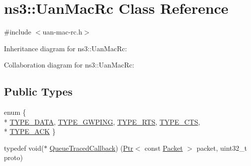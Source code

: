 \hypertarget{classns3_1_1UanMacRc}{}\section{ns3\+:\+:Uan\+Mac\+Rc Class Reference}
\label{classns3_1_1UanMacRc}


{\ttfamily \#include $<$uan-\/mac-\/rc.\+h$>$}



Inheritance diagram for ns3\+:\+:Uan\+Mac\+Rc\+:


Collaboration diagram for ns3\+:\+:Uan\+Mac\+Rc\+:
\subsection*{Public Types}
\begin{DoxyCompactItemize}
\item 
enum \{ \\*
\hyperlink{classns3_1_1UanMacRc_ad12bbd636f03943095e1c81cd1cc24b3a21bca93e0670db9a343de5d95ff64092}{T\+Y\+P\+E\+\_\+\+D\+A\+TA}, 
\hyperlink{classns3_1_1UanMacRc_ad12bbd636f03943095e1c81cd1cc24b3a704bedfcbfafb80b9a7d280385e60e8b}{T\+Y\+P\+E\+\_\+\+G\+W\+P\+I\+NG}, 
\hyperlink{classns3_1_1UanMacRc_ad12bbd636f03943095e1c81cd1cc24b3a04488fc6d8b08804abbb178e0af7a6dc}{T\+Y\+P\+E\+\_\+\+R\+TS}, 
\hyperlink{classns3_1_1UanMacRc_ad12bbd636f03943095e1c81cd1cc24b3a6c74a18f3ef5f623c1301ed43d64eaa6}{T\+Y\+P\+E\+\_\+\+C\+TS}, 
\\*
\hyperlink{classns3_1_1UanMacRc_ad12bbd636f03943095e1c81cd1cc24b3a39266e2ea841589d68abb33f3691d9b3}{T\+Y\+P\+E\+\_\+\+A\+CK}
 \}
\item 
typedef void($\ast$ \hyperlink{classns3_1_1UanMacRc_a12577d95d0f536a3496bb248de9ea8df}{Queue\+Traced\+Callback}) (\hyperlink{classns3_1_1Ptr}{Ptr}$<$ const \hyperlink{classns3_1_1Packet}{Packet} $>$ packet, uint32\+\_\+t proto)
\end{DoxyCompactItemize}
